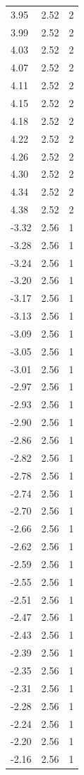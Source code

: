 \begin{longtable}{lrr}
  3.95 & 2.52 & 2 \\
  3.99 & 2.52 & 2 \\
  4.03 & 2.52 & 2 \\
  4.07 & 2.52 & 2 \\
  4.11 & 2.52 & 2 \\
  4.15 & 2.52 & 2 \\
  4.18 & 2.52 & 2 \\
  4.22 & 2.52 & 2 \\
  4.26 & 2.52 & 2 \\
  4.30 & 2.52 & 2 \\
  4.34 & 2.52 & 2 \\
  4.38 & 2.52 & 2 \\
  -3.32 & 2.56 & 1 \\
  -3.28 & 2.56 & 1 \\
  -3.24 & 2.56 & 1 \\
  -3.20 & 2.56 & 1 \\
  -3.17 & 2.56 & 1 \\
  -3.13 & 2.56 & 1 \\
  -3.09 & 2.56 & 1 \\
  -3.05 & 2.56 & 1 \\
  -3.01 & 2.56 & 1 \\
  -2.97 & 2.56 & 1 \\
  -2.93 & 2.56 & 1 \\
  -2.90 & 2.56 & 1 \\
  -2.86 & 2.56 & 1 \\
  -2.82 & 2.56 & 1 \\
  -2.78 & 2.56 & 1 \\
  -2.74 & 2.56 & 1 \\
  -2.70 & 2.56 & 1 \\
  -2.66 & 2.56 & 1 \\
  -2.62 & 2.56 & 1 \\
  -2.59 & 2.56 & 1 \\
  -2.55 & 2.56 & 1 \\
  -2.51 & 2.56 & 1 \\
  -2.47 & 2.56 & 1 \\
  -2.43 & 2.56 & 1 \\
  -2.39 & 2.56 & 1 \\
  -2.35 & 2.56 & 1 \\
  -2.31 & 2.56 & 1 \\
  -2.28 & 2.56 & 1 \\
  -2.24 & 2.56 & 1 \\
  -2.20 & 2.56 & 1 \\
  -2.16 & 2.56 & 1 \\

\end{longtable}
